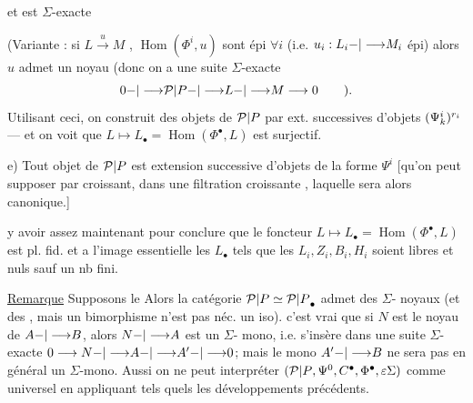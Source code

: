 et est $\Sigma$-exacte

(Variante : si $L\xrightarrow{u}M$ ,
$\operatorname{Hom}(\Phi^i,u)$ sont épi $\forall i$ (i.e. $u_i:L_i{-|\longrightarrow}M_i$
épi) alors $u$  admet un noyau
(donc on a une suite $\Sigma$-exacte
\[
0{-|\longrightarrow}{\mathcal P|P}{-|\longrightarrow}L{-|\longrightarrow}M\longrightarrow0\qquad).
\]
Utilisant ceci, on construit des objets
de ${\mathcal P|P}$ par ext. successives d'objets
$(\Psi_{{k}}^i)^{{r_i}}$ --- et on voit que $L\longmapsto L_\bullet=
\operatorname{Hom}(\Phi^\bullet,L)$ est  surjectif.

e) Tout objet de ${\mathcal P|P}$ est extension successive
d'objets de la forme $\Psi^i$ [qu'on peut
supposer  par  croissant, dans
une filtration croissante ,
laquelle sera alors canonique.]

 y avoir assez maintenant
pour conclure que le foncteur
$L\longmapsto L_\bullet=\operatorname{Hom}(\Phi^\bullet,L)$ est pl. fid. et
a l'image essentielle les $L_\bullet$ tels
que les $L_i,Z_i,B_i,H_i$ soient libres 
et  nuls sauf un nb fini.

\uline{Remarque} Supposons le  Alors
la catégorie ${\mathcal P|P}\simeq{\mathcal P|P}_\bullet$  admet des $\Sigma$-
noyaux (et des , mais un
bimorphisme n'est pas néc. un iso). 
c'est  vrai que si $N$ est le noyau
de $A{-|\longrightarrow}B$, alors $N{-|\longrightarrow}A$ est un $\Sigma$-
mono, i.e. s'insère dans une suite $\Sigma$-exacte
$0\longrightarrow N{-|\longrightarrow}A{-|\longrightarrow}A'{-|\longrightarrow}0$; mais le mono
$A'{-|\longrightarrow}B$ ne sera pas en général un
$\Sigma$-mono. Aussi on ne peut interpréter
$({\mathcal P|P},{\Psi^0},C^\bullet,{\Phi^\bullet,\varepsilon}\Sigma)$
comme   universel en appliquant tels quels les
développements précédents.

